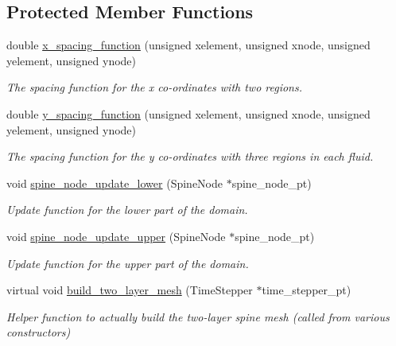\subsection*{Protected Member Functions}
\begin{DoxyCompactItemize}
\item 
double \hyperlink{classoomph_1_1TwoLayerSpineMesh_a5fd9eae27ba19788e0b397936f0c5ead}{x\+\_\+spacing\+\_\+function} (unsigned xelement, unsigned xnode, unsigned yelement, unsigned ynode)
\begin{DoxyCompactList}\small\item\em The spacing function for the x co-\/ordinates with two regions. \end{DoxyCompactList}\item 
double \hyperlink{classoomph_1_1TwoLayerSpineMesh_a2d05d5228e3831021ab48dd429ada890}{y\+\_\+spacing\+\_\+function} (unsigned xelement, unsigned xnode, unsigned yelement, unsigned ynode)
\begin{DoxyCompactList}\small\item\em The spacing function for the y co-\/ordinates with three regions in each fluid. \end{DoxyCompactList}\item 
void \hyperlink{classoomph_1_1TwoLayerSpineMesh_a7973ed642b9adff26bf531c76dade747}{spine\+\_\+node\+\_\+update\+\_\+lower} (Spine\+Node $\ast$spine\+\_\+node\+\_\+pt)
\begin{DoxyCompactList}\small\item\em Update function for the lower part of the domain. \end{DoxyCompactList}\item 
void \hyperlink{classoomph_1_1TwoLayerSpineMesh_adc173b7505ec801a4aa688f97ffe55e0}{spine\+\_\+node\+\_\+update\+\_\+upper} (Spine\+Node $\ast$spine\+\_\+node\+\_\+pt)
\begin{DoxyCompactList}\small\item\em Update function for the upper part of the domain. \end{DoxyCompactList}\item 
virtual void \hyperlink{classoomph_1_1TwoLayerSpineMesh_ada5471a89c3ac91a606b3e5dcc1325cd}{build\+\_\+two\+\_\+layer\+\_\+mesh} (Time\+Stepper $\ast$time\+\_\+stepper\+\_\+pt)
\begin{DoxyCompactList}\small\item\em Helper function to actually build the two-\/layer spine mesh (called from various constructors) \end{DoxyCompactList}\end{DoxyCompactItemize}
